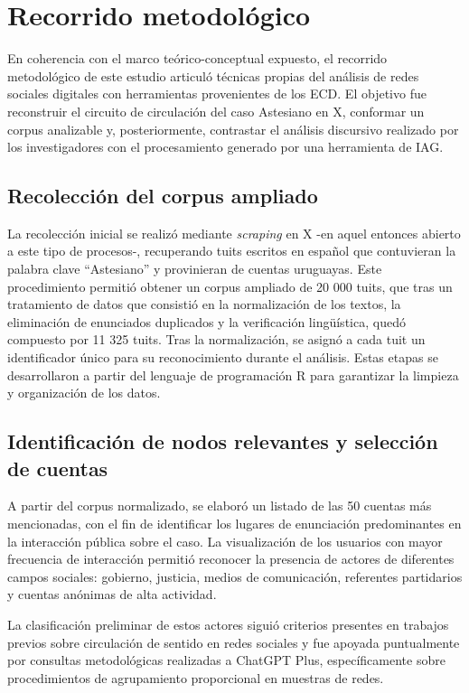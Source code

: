\documentclass[spanish]{textolivre}
\begin{document}
\section{Recorrido metodológico}\label{sec-titulo}
En coherencia con el marco teórico-conceptual expuesto, el recorrido metodológico de este estudio articuló técnicas propias del análisis de redes sociales digitales con herramientas provenientes de los ECD. El objetivo fue reconstruir el circuito de circulación del caso Astesiano en X, conformar un corpus analizable y, posteriormente, contrastar el análisis discursivo realizado por los investigadores con el procesamiento generado por una herramienta de IAG.

\subsection{Recolección del corpus ampliado}\label{sec-autores}
La recolección inicial se realizó mediante \textit{scraping} en X -en aquel entonces abierto a este tipo de procesos-, recuperando tuits escritos en español que contuvieran la palabra clave “Astesiano” y provinieran de cuentas uruguayas. Este procedimiento permitió obtener un corpus ampliado de 20 000 tuits, que tras un tratamiento de datos que consistió en la normalización de los textos, la eliminación de enunciados duplicados y la verificación lingüística, quedó compuesto por 11 325 tuits. Tras la normalización, se asignó a cada tuit un identificador único para su reconocimiento durante el análisis. Estas etapas se desarrollaron a partir del lenguaje de programación R para garantizar la limpieza y organización de los datos.

\subsection{Identificación de nodos relevantes y selección de cuentas}\label{sec-idioma}
A partir del corpus normalizado, se elaboró un listado de las 50 cuentas más mencionadas, con el fin de identificar los lugares de enunciación predominantes en la interacción pública sobre el caso. La visualización de los usuarios con mayor frecuencia de interacción permitió reconocer la presencia de actores de diferentes campos sociales: gobierno, justicia, medios de comunicación, referentes partidarios y cuentas anónimas de alta actividad.

La clasificación preliminar de estos actores siguió criterios presentes en trabajos previos sobre circulación de sentido en redes sociales y fue apoyada puntualmente por consultas metodológicas realizadas a ChatGPT Plus, específicamente sobre procedimientos de agrupamiento proporcional en muestras de redes.
\end{document}
